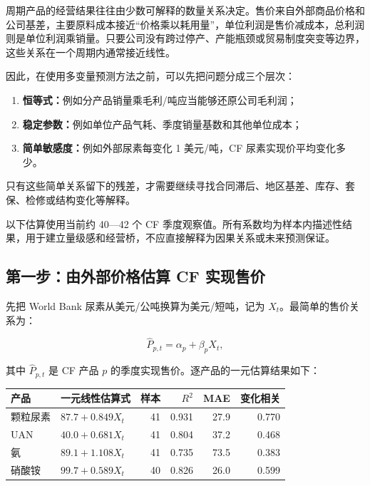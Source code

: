 \documentclass[11pt,a4paper]{ctexart}
\begin{document}
周期产品的经营结果往往由少数可解释的数量关系决定。售价来自外部商品价格和公司基差，主要原料成本接近“价格乘以耗用量”，单位利润是售价减成本，总利润则是单位利润乘销量。只要公司没有跨过停产、产能瓶颈或贸易制度突变等边界，这些关系在一个周期内通常接近线性。

因此，在使用多变量预测方法之前，可以先把问题分成三个层次：

\begin{enumerate}
  \item \textbf{恒等式：}例如分产品销量乘毛利/吨应当能够还原公司毛利润；
  \item \textbf{稳定参数：}例如单位产品气耗、季度销量基数和其他单位成本；
  \item \textbf{简单敏感度：}例如外部尿素每变化 1 美元/吨，CF 尿素实现价平均变化多少。
\end{enumerate}

只有这些简单关系留下的残差，才需要继续寻找合同滞后、地区基差、库存、套保、检修或结构变化等解释。

以下估算使用当前约 40---42 个 CF 季度观察值。所有系数均为样本内描述性结果，用于建立量级感和经营桥，不应直接解释为因果关系或未来预测保证。

\subsection{第一步：由外部价格估算 CF 实现售价}

先把 World Bank 尿素从美元/公吨换算为美元/短吨，记为 $X_t$。最简单的售价关系为：

\begin{equation*}
\widehat{P}_{p,t}=\alpha_p+\beta_p X_t,
\end{equation*}

其中 $\widehat{P}_{p,t}$ 是 CF 产品 $p$ 的季度实现售价。逐产品的一元估算结果如下：

\begin{center}
\small
\begin{tabularx}{\textwidth}{L{2.5cm}Y r r r r}
\toprule
产品 & 一元线性估算式 & 样本 & $R^2$ & MAE & 变化相关 \\
\midrule
颗粒尿素 & $87.7+0.849X_t$ & 41 & 0.931 & 27.9 & 0.770 \\
UAN & $40.0+0.681X_t$ & 41 & 0.804 & 37.2 & 0.468 \\
氨 & $89.1+1.108X_t$ & 41 & 0.735 & 73.5 & 0.383 \\
硝酸铵 & $99.7+0.589X_t$ & 40 & 0.826 & 26.0 & 0.599 \\
\bottomrule
\end{tabularx}
\normalsize
\end{center}
\end{document}
